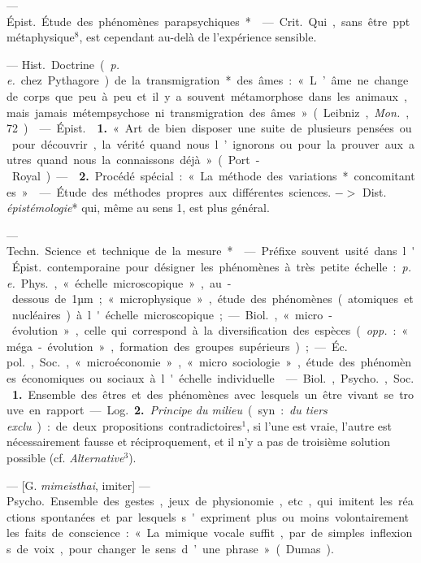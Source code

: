 \begin{itemize}[leftmargin=1cm, label=, itemsep=1pt]
 — \si{Épist.} Étude des phénomènes parapsychiques*.

 — \si{Crit.} Qui, sans être ppt. métaphysique$^8$, est
cependant au-delà de l'expérience sensible.

 — \si{Hist.} Doctrine ({\it p. e.} chez Pythagore) de la
transmigration* des âmes : « L’âme ne change de corps que peu à peu... et il y
a souvent métamorphose dans les animaux, mais jamais métempsychose ni
transmigration des âmes » (Leibniz, {\it Mon.}, 72).

 — \si{Épist.}  {\bf 1.} « Art de bien disposer
une suite de plusieurs pensées ou pour découvrir, la vérité
quand nous l’ignorons ou pour la prouver aux autres quand nous la connaissons
déjà » (Port-Royal). —  {\bf 2.} Procédé spécial : « La
méthode des variations* concomitantes ».

 — Étude des méthodes propres aux différentes sciences. $->$
Dist. {\it épistémologie}* qui, même au sens 1, est plus général.

 — \si{Techn.} Science et technique de la mesure*.

 — Préfixe souvent usité dans l'\si{Épist.} contemporaine pour
désigner les phénomènes à très petite échelle : {\it p. e.} \si{Phys.},
« échelle microscopique », au-dessous de 1µm ; « microphysique », étude des
phénomènes (atomiques et nucléaires) à l'échelle microscopique; — \si{Biol.},
« micro-évolution », celle qui correspond à la diversification des espèces
({\it opp.} : « méga-évolution », formation des groupes supérieurs) ; —
\si{Éc. pol.}, \si{Soc.}, « microéconomie », « micro sociologie », étude des
phénomènes économiques ou sociaux à l'échelle individuelle.

 — \si{Biol.}, \si{Psycho.}, \si{Soc.} {\bf 1.} Ensemble des êtres
et des phénomènes avec lesquels un être vivant se trouve en rapport.

— \si{Log.} {\bf 2.} {\it Principe du milieu} (syn. : {\it du tiers exclu}) :
de deux propositions contradictoires$^1$, si l’une est vraie, l’autre est
nécessairement fausse et réciproquement, et il n’y a pas de troisième
solution possible (cf. {\it Alternative}$^3$).

 — [G. {\it mimeisthai}, imiter] — \si{Psycho.} Ensemble des
gestes, jeux de physionomie, etc, qui imitent les réactions spontanées et par
lesquels s'expriment plus ou moins volontairement les faits de conscience :
« La mimique vocale suffit, par de simples inflexions de voix, pour changer
le sens d’une phrase » (Dumas).


\end{itemize}
